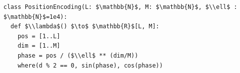 \documentclass[border=10pt]{standalone}
\begin{document}
\begin{lstlisting}
class PositionEncoding(L: $\mathbb{N}$, M: $\mathbb{N}$, $\\ell$ : $\mathbb{N}$=1e4):
  def $\\lambda$() $\to$ $\mathbb{R}$[L, M]:
    pos = [1..L]
    dim = [1..M]
    phase = pos / ($\\ell$ ** (dim/M))   
    where(d % 2 == 0, sin(phase), cos(phase))
\end{lstlisting}
\end{document}
